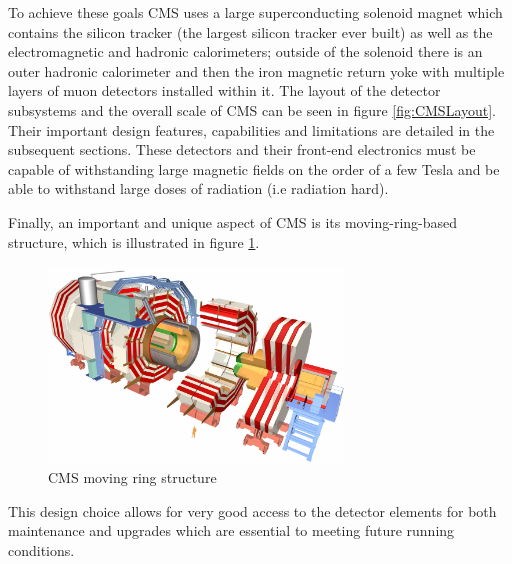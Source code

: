 To achieve these goals CMS uses a large superconducting solenoid magnet which contains
the silicon tracker (the largest silicon tracker ever built) 
as well as the electromagnetic and hadronic calorimeters;
outside of the solenoid there is an outer hadronic calorimeter
and then the iron magnetic return yoke with multiple layers of muon
detectors installed within it. 
The layout of the detector subsystems and the overall scale of 
CMS can be seen in figure \ref{fig:CMSLayout}.
Their important design features, capabilities and limitations
are detailed in the subsequent sections. 
These detectors and their front-end electronics must be capable of withstanding
large magnetic fields on the order of a few Tesla and
 be able to withstand large doses of radiation (i.e radiation hard). 

Finally, an important and unique aspect of CMS is its moving-ring-based structure,
which is illustrated in figure \ref{fig:CMSMovingRing}.
\begin{figure}[hb]
  \centering
	\includegraphics[width=0.7\textwidth]{images/MovingRing.jpg}
  	\caption[Moving Ring Structure]
   	{CMS moving ring structure}
	\label{fig:CMSMovingRing}
\end{figure}
This design choice allows for very good access to the detector elements for 
both maintenance and upgrades which are essential to meeting future running conditions.
